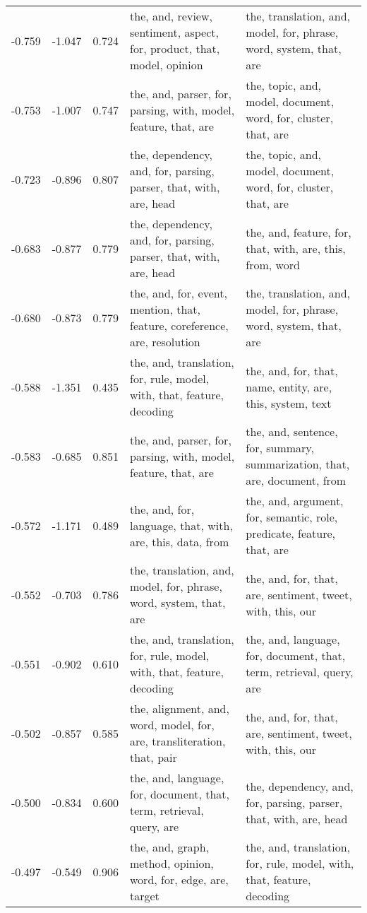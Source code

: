 \begin{tabular}{cccp{5cm}p{5cm}}
-0.759 & -1.047 & 0.724 & the, and, review, sentiment, aspect, for, product, that, model, opinion & the, translation, and, model, for, phrase, word, system, that, are \\
-0.753 & -1.007 & 0.747 & the, and, parser, for, parsing, with, model, feature, that, are & the, topic, and, model, document, word, for, cluster, that, are \\
-0.723 & -0.896 & 0.807 & the, dependency, and, for, parsing, parser, that, with, are, head & the, topic, and, model, document, word, for, cluster, that, are \\
-0.683 & -0.877 & 0.779 & the, dependency, and, for, parsing, parser, that, with, are, head & the, and, feature, for, that, with, are, this, from, word \\
-0.680 & -0.873 & 0.779 & the, and, for, event, mention, that, feature, coreference, are, resolution & the, translation, and, model, for, phrase, word, system, that, are \\
-0.588 & -1.351 & 0.435 & the, and, translation, for, rule, model, with, that, feature, decoding & the, and, for, that, name, entity, are, this, system, text \\
-0.583 & -0.685 & 0.851 & the, and, parser, for, parsing, with, model, feature, that, are & the, and, sentence, for, summary, summarization, that, are, document, from \\
-0.572 & -1.171 & 0.489 & the, and, for, language, that, with, are, this, data, from & the, and, argument, for, semantic, role, predicate, feature, that, are \\
-0.552 & -0.703 & 0.786 & the, translation, and, model, for, phrase, word, system, that, are & the, and, for, that, are, sentiment, tweet, with, this, our \\
-0.551 & -0.902 & 0.610 & the, and, translation, for, rule, model, with, that, feature, decoding & the, and, language, for, document, that, term, retrieval, query, are \\
-0.502 & -0.857 & 0.585 & the, alignment, and, word, model, for, are, transliteration, that, pair & the, and, for, that, are, sentiment, tweet, with, this, our \\
-0.500 & -0.834 & 0.600 & the, and, language, for, document, that, term, retrieval, query, are & the, dependency, and, for, parsing, parser, that, with, are, head \\
-0.497 & -0.549 & 0.906 & the, and, graph, method, opinion, word, for, edge, are, target & the, and, translation, for, rule, model, with, that, feature, decoding \\

\end{tabular}
